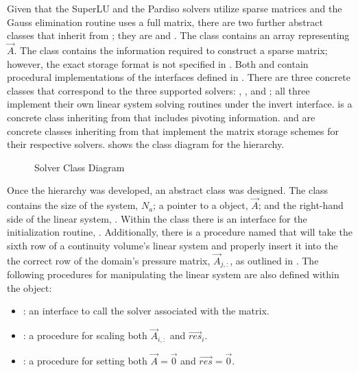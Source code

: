 Given that the SuperLU and the Pardiso solvers utilize sparse matrices and the Gauss elimination routine uses a full matrix, there are two further abstract classes that inherit from ; they are  and .
The  class contains an array representing $\vec{A}$.
The  class contains the information required to construct a sparse matrix; however, the exact storage format is not specified in .
Both  and  contain procedural implementations of the interfaces defined in .
There are three concrete classes that correspond to the three supported solvers: , , and ; all three implement their own linear system solving routines under the invert interface.
 is a concrete class inheriting from  that includes pivoting information.
 and  are concrete classes inheriting from  that implement the matrix storage schemes for their respective solvers.
 shows the class diagram for the  hierarchy.

\begin{figure}[ht!]
\singlespace\centering

\caption{Solver Class Diagram}
\label{fig:solverClassDiagram}
\end{figure}

Once the  hierarchy was developed, an abstract  class was designed.
The  class contains the size of the system, $N_{a}$; a pointer to a  object, $\vec{A}$; and the right-hand side of the linear system, .
Within the  class there is an interface for the initialization routine, .
Additionally, there is a procedure named  that will take the sixth row of a continuity volume's linear system and properly insert it into the the correct row of the domain's pressure matrix, $\vec{A}_{j,:}$, as outlined in .
The following procedures for manipulating the linear system are also defined within the  object:

\begin{itemize}
\item{  : an interface to call the solver associated with the matrix.}
\item{  : a procedure for scaling both $\vec{A}_{i, :}$ and $\vec{res}_{i}$.}
\item{  : a procedure for setting both $\vec{A} = \vec{0}$ and $\vec{res} = \vec{0}$.}
\end{itemize}

